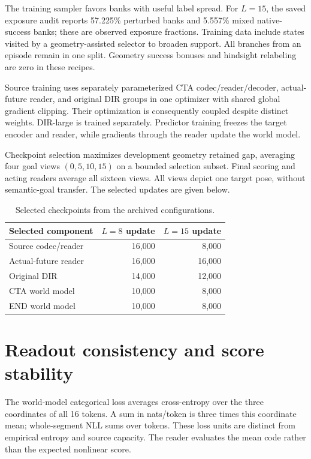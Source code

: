 \documentclass[10pt,twocolumn,letterpaper]{article}
\begin{document}
The training sampler favors banks with useful label spread. For $L=15$, the saved exposure audit reports 57.225\% perturbed banks and 5.557\% mixed native-success banks; these are observed exposure fractions. Training data include states visited by a geometry-assisted selector to broaden support. All branches from an episode remain in one split. Geometry success bonuses and hindsight relabeling are zero in these recipes.

Source training uses separately parameterized CTA codec/reader/decoder, actual-future reader, and original DIR groups in one optimizer with shared global gradient clipping. Their optimization is consequently coupled despite distinct weights. DIR-large is trained separately. Predictor training freezes the target encoder and reader, while gradients through the reader update the world model.

Checkpoint selection maximizes development geometry retained gap, averaging four goal views $(0,5,10,15)$ on a bounded selection subset. Final scoring and acting readers average all sixteen views. All views depict one target pose, without semantic-goal transfer. The selected updates are given below.

\begin{table}[t]
\centering\small
\begin{tabular}{lrr}
\toprule
Selected component & $L=8$ update & $L=15$ update \\
\midrule
Source codec/reader & 16,000 & 8,000 \\
Actual-future reader & 16,000 & 16,000 \\
Original DIR & 14,000 & 12,000 \\
CTA world model & 10,000 & 8,000 \\
END world model & 10,000 & 8,000 \\
\bottomrule
\end{tabular}
\caption{Selected checkpoints from the archived configurations.}
\end{table}

\section{Readout consistency and score stability}
The world-model categorical loss averages cross-entropy over the three coordinates of all 16 tokens. A sum in nats/token is three times this coordinate mean; whole-segment NLL sums over tokens. These loss units are distinct from empirical entropy and source capacity. The reader evaluates the mean code rather than the expected nonlinear score.
\end{document}

